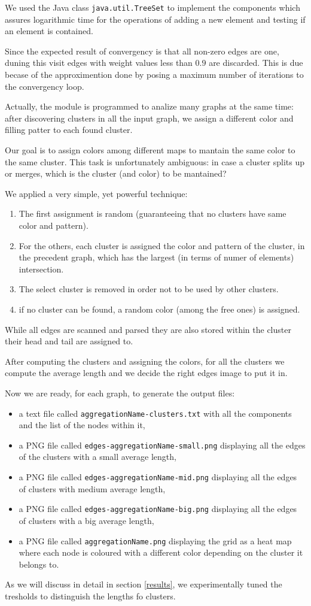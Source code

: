 We used the Java class \verb!java.util.TreeSet! to implement
the components which assures logarithmic time for
the operations of adding a new element and testing if an element
is contained. 

Since the expected result of convergency is that all non-zero edges
are one, duning this visit edges with weight values less than $0.9$
are discarded. This is due becase of the approximention done by
posing a maximum number of iterations to the convergency loop.

Actually, the module is programmed to analize many graphs at the same
time:
after discovering clusters in all the input graph, we assign
a different color and filling patter to each found cluster.

Our goal is to assign colors among different maps to mantain
the same color to the same cluster. This task is unfortunately
ambiguous: in case a cluster splits up or merges, which is the cluster
(and color) to be mantained?

We applied a very simple, yet powerful technique: 
\begin{enumerate}
\item The first assignment is random (guaranteeing  
that no clusters have same color and pattern).
\item For the others, each cluster is assigned the color and
pattern of the cluster, in the precedent graph, which
has the largest (in terms of numer of elements) intersection.
\item The select cluster is removed in order not to be used
by other clusters.
\item if no cluster can be found, a random color (among the free ones)
is assigned.
\end{enumerate}

While all edges are scanned and parsed they are also stored
within the cluster their head and tail are assigned to.

After computing the clusters and assigning the colors,
for all the clusters we compute the average length and we
decide the right edges image to put it in.

Now we are ready, for each graph, to generate the output files:
\begin{itemize}
\item a text file called \verb!aggregationName-clusters.txt! with all the components and
the list of the nodes within it,
\item a PNG file called \verb!edges-aggregationName-small.png! displaying all the edges of
the clusters with a small average length,
\item a PNG file called \verb!edges-aggregationName-mid.png! displaying all the edges 
of clusters with medium average length,
\item a PNG file called \verb!edges-aggregationName-big.png! displaying all the edges
of clusters with a big average length,
\item a PNG file called \verb!aggregationName.png! displaying the grid  as a 
heat map where
each node is coloured with a different color depending on the cluster it
belongs to.
\end{itemize}

As we will discuss in detail in section \ref{results}, we experimentally tuned the tresholds to distinguish the lengths fo clusters.
